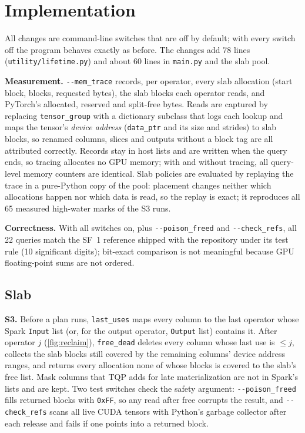 \documentclass[10pt,twocolumn,letterpaper]{article}
\newcommand{\code}[1]{\texttt{\small #1}}
\begin{document}
\section{Implementation}
\label{sec:impl}
All changes are command-line switches that are off by default; with every switch off
the program behaves exactly as before. The changes add 78 lines
(\code{utility/lifetime.py}) and about 60 lines in \code{main.py} and the slab pool.

\textbf{Measurement.} \code{-{}-mem\_trace} records, per operator, every slab allocation
(start block, blocks, requested bytes), the slab blocks each operator reads, and PyTorch's
allocated, reserved and split-free bytes. Reads are captured by replacing
\code{tensor\_group} with a dictionary subclass that logs each lookup and maps the tensor's
\emph{device address} (\code{data\_ptr} and its size and strides) to slab blocks, so
renamed columns, slices and outputs without a block tag are all attributed correctly.
Records stay in host lists and are written when the query ends, so tracing allocates no
GPU memory; with and without tracing, all query-level memory counters are identical.
Slab policies are evaluated by replaying the trace in a pure-Python copy of the pool:
placement changes neither which allocations happen nor which data is read, so the replay
is exact; it reproduces all 65 measured high-water marks of the S3 runs.

\textbf{Correctness.} With all switches on, plus \code{-{}-poison\_freed} and
\code{-{}-check\_refs}, all 22 queries match the SF~1 reference shipped with the repository
under its test rule (10 significant digits); bit-exact comparison is not meaningful because
GPU floating-point sums are not ordered.

\subsection{Slab}
\textbf{S3.} Before a plan runs, \code{last\_uses} maps every column to the last operator
whose Spark \code{Input} list (or, for the output operator, \code{Output} list) contains it.
After operator $j$ (\cref{fig:reclaim}), \code{free\_dead} deletes every column whose last
use is $\le j$, collects the slab blocks still covered by the remaining columns' device
address ranges, and returns every allocation none of whose blocks is covered to the slab's free list. Mask
columns that TQP adds for late materialization are not in Spark's lists and are kept.
Two test switches check the safety argument: \code{-{}-poison\_freed} fills returned blocks
with \code{0xFF}, so any read after free corrupts the result, and \code{-{}-check\_refs}
scans all live CUDA tensors with Python's garbage collector after each release and fails
if one points into a returned block.
\end{document}
